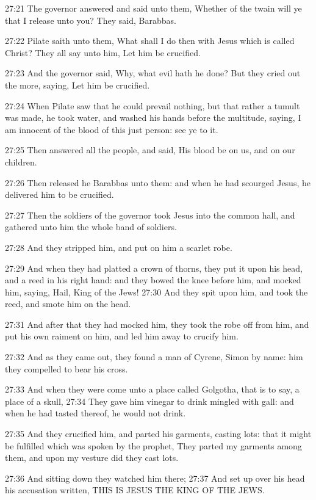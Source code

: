 27:21 The governor answered and said unto them, Whether of the twain
will ye that I release unto you? They said, Barabbas.

27:22 Pilate saith unto them, What shall I do then with Jesus which is
called Christ? They all say unto him, Let him be crucified.

27:23 And the governor said, Why, what evil hath he done? But they
cried out the more, saying, Let him be crucified.

27:24 When Pilate saw that he could prevail nothing, but that rather a
tumult was made, he took water, and washed his hands before the
multitude, saying, I am innocent of the blood of this just person: see
ye to it.

27:25 Then answered all the people, and said, His blood be on us, and
on our children.

27:26 Then released he Barabbas unto them: and when he had scourged
Jesus, he delivered him to be crucified.

27:27 Then the soldiers of the governor took Jesus into the common
hall, and gathered unto him the whole band of soldiers.

27:28 And they stripped him, and put on him a scarlet robe.

27:29 And when they had platted a crown of thorns, they put it upon
his head, and a reed in his right hand: and they bowed the knee before
him, and mocked him, saying, Hail, King of the Jews!  27:30 And they
spit upon him, and took the reed, and smote him on the head.

27:31 And after that they had mocked him, they took the robe off from
him, and put his own raiment on him, and led him away to crucify him.

27:32 And as they came out, they found a man of Cyrene, Simon by name:
him they compelled to bear his cross.

27:33 And when they were come unto a place called Golgotha, that is to
say, a place of a skull, 27:34 They gave him vinegar to drink mingled
with gall: and when he had tasted thereof, he would not drink.

27:35 And they crucified him, and parted his garments, casting lots:
that it might be fulfilled which was spoken by the prophet, They
parted my garments among them, and upon my vesture did they cast lots.

27:36 And sitting down they watched him there; 27:37 And set up over
his head his accusation written, THIS IS JESUS THE KING OF THE JEWS.

